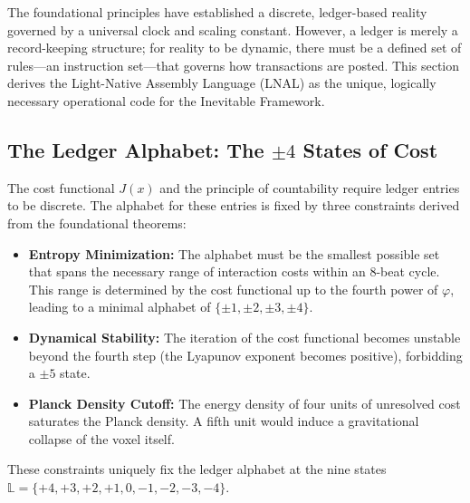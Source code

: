 The foundational principles have established a discrete, ledger-based reality governed by a universal clock and scaling constant. However, a ledger is merely a record-keeping structure; for reality to be dynamic, there must be a defined set of rules—an instruction set—that governs how transactions are posted. This section derives the Light-Native Assembly Language (LNAL) as the unique, logically necessary operational code for the Inevitable Framework.

\subsection{The Ledger Alphabet: The \(\pm4\) States of Cost}
The cost functional \(J(x)\) and the principle of countability require ledger entries to be discrete. The alphabet for these entries is fixed by three constraints derived from the foundational theorems:
\begin{itemize}
    \item \textbf{Entropy Minimization:} The alphabet must be the smallest possible set that spans the necessary range of interaction costs within an 8-beat cycle. This range is determined by the cost functional up to the fourth power of \(\varphi\), leading to a minimal alphabet of \(\{\pm1, \pm2, \pm3, \pm4\}\).
    \item \textbf{Dynamical Stability:} The iteration of the cost functional becomes unstable beyond the fourth step (the Lyapunov exponent becomes positive), forbidding a \(\pm5\) state.
    \item \textbf{Planck Density Cutoff:} The energy density of four units of unresolved cost saturates the Planck density. A fifth unit would induce a gravitational collapse of the voxel itself.
\end{itemize}
These constraints uniquely fix the ledger alphabet at the nine states \(\mathbb{L} = \{+4, +3, +2, +1, 0, -1, -2, -3, -4\}\).

